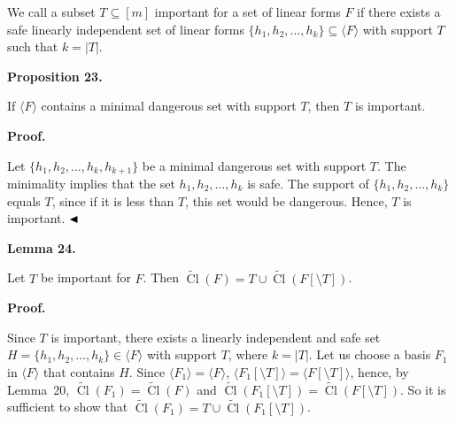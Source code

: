 \documentclass[10pt,a4paper]{article}
\begin{document}
We call a subset $T\subseteq[m]$ important for a set of linear forms $F$ if there exists a safe linearly independent set of linear forms $\{h_{1},h_{2},\dots,h_{k}\}\subseteq\langle F\rangle$ with support $T$ such that $k=|T|$.\par



\par\medskip\noindent\textbf{
Proposition 23.
}\par



If $\langle F\rangle$ contains a minimal dangerous set with support $T$, then $T$ is important.\par



\par\medskip\noindent\textbf{Proof.}\par


Let $\{h_{1},h_{2},\dots,h_{k},h_{k+1}\}$ be a minimal dangerous set with support $T$.
The minimality implies that the set $h_{1},h_{2},\dots,h_{k}$ is safe. The support of $\{h_{1},h_{2},\dots,h_{k}\}$ equals $T$, since if it is less than $T$, this set would be dangerous. Hence, $T$ is important.
$\hfill\blacktriangleleft$\par



\par\medskip\noindent\textbf{
Lemma 24.
}\par



Let $T$ be important for $F$. Then $\widetilde{\mathop{\mathrm{Cl}}}(F)=T\cup\widetilde{\mathop{\mathrm{Cl}}}(F[\setminus T])$.\par



\par\medskip\noindent\textbf{Proof.}\par


Since $T$ is important, there exists a linearly independent and safe set $H=\{h_{1},h_{2},\dots,h_{k}\}\in\langle F\rangle$ with support $T$, where $k=|T|$. Let us choose a basis $F_{1}$ in $\langle F\rangle$ that contains $H$. Since $\langle F_{1}\rangle=\langle F\rangle$, $\langle F_{1}[\setminus T]\rangle=\langle F[\setminus T]\rangle$, hence, by Lemma 20, $\widetilde{\mathop{\mathrm{Cl}}}(F_{1})=\widetilde{\mathop{\mathrm{Cl}}}(F)$ and $\widetilde{\mathop{\mathrm{Cl}}}(F_{1}[\setminus T])=\widetilde{\mathop{\mathrm{Cl}}}(F[\setminus T])$. So it is sufficient to show that $\widetilde{\mathop{\mathrm{Cl}}}(F_{1})=T\cup\widetilde{\mathop{\mathrm{Cl}}}(F_{1}[\setminus T])$.\par
\end{document}
